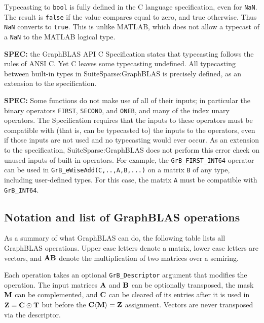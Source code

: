 \documentclass[12pt]{article}
\begin{document}
Typecasting to \verb'bool' is fully defined in the C language specification,
even for \verb'NaN'.  The result is \verb'false' if the value compares equal to
zero, and true otherwise.  Thus \verb'NaN' converts to \verb'true'.  This is
unlike MATLAB, which does not allow a typecast of a \verb'NaN' to the MATLAB
logical type.

\begin{alert}
{\bf SPEC:} the GraphBLAS API C Specification states that typecasting follows
the rules of ANSI C.  Yet C leaves some typecasting undefined.  All typecasting
between built-in types in SuiteSparse:GraphBLAS is precisely defined, as an
extension to the specification.
\end{alert}

\begin{alert}
{\bf SPEC:} Some functions do not make use of all of their inputs; in
particular the binary operators \verb'FIRST', \verb'SECOND', and \verb'ONEB',
and many of the index unary operators.  The Specification requires that the
inputs to these operators must be compatible with (that is, can be typecasted
to) the inputs to the operators, even if those inputs are not used and no
typecasting would ever occur.  As an extension to the specification,
SuiteSparse:GraphBLAS does not perform this error check on unused inputs of
built-in operators.  For example, the \verb'GrB_FIRST_INT64' operator can be
used in \verb'GrB_eWiseAdd(C,..,A,B,...)' on a matrix \verb'B' of any type,
including user-defined types.  For this case, the matrix \verb'A' must be
compatible with \verb'GrB_INT64'.
\end{alert}

\subsection{Notation and list of GraphBLAS operations} %
\label{list}

As a summary of what GraphBLAS can do, the following table lists all GraphBLAS
operations.  Upper case letters denote a matrix, lower case letters are
vectors, and ${\bf AB}$ denote the multiplication of two matrices over a
semiring.

Each operation takes an optional \verb'GrB_Descriptor' argument that modifies
the operation.  The input matrices ${\bf A}$ and ${\bf B}$ can be optionally
transposed, the mask ${\bf M}$ can be complemented, and ${\bf C}$ can be
cleared of its entries after it is used in ${\bf Z = C \odot T}$ but before
the ${\bf C \langle M \rangle = Z}$ assignment.
Vectors are never transposed via the descriptor.
\end{document}
